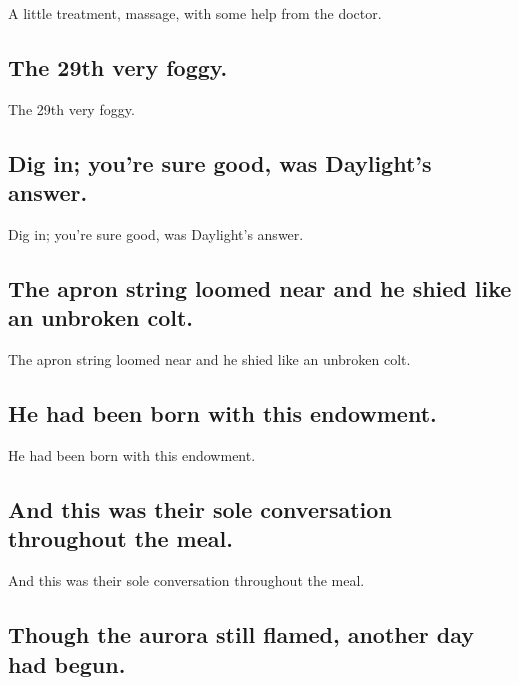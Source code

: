 \documentclass[]{article}
\begin{document}
A little treatment, massage, with some help from the doctor.

\hypertarget{the-29th-very-foggy.}{%
\subsection{The 29th very foggy.}\label{the-29th-very-foggy.}}

The 29th very foggy.

\hypertarget{dig-in-youre-sure-good-was-daylights-answer.}{%
\subsection{Dig in; you're sure good, was Daylight's
answer.}\label{dig-in-youre-sure-good-was-daylights-answer.}}

Dig in; you're sure good, was Daylight's answer.

\hypertarget{the-apron-string-loomed-near-and-he-shied-like-an-unbroken-colt.}{%
\subsection{The apron string loomed near and he shied like an unbroken
colt.}\label{the-apron-string-loomed-near-and-he-shied-like-an-unbroken-colt.}}

The apron string loomed near and he shied like an unbroken colt.

\hypertarget{he-had-been-born-with-this-endowment.}{%
\subsection{He had been born with this
endowment.}\label{he-had-been-born-with-this-endowment.}}

He had been born with this endowment.

\hypertarget{and-this-was-their-sole-conversation-throughout-the-meal.}{%
\subsection{And this was their sole conversation throughout the
meal.}\label{and-this-was-their-sole-conversation-throughout-the-meal.}}

And this was their sole conversation throughout the meal.

\hypertarget{though-the-aurora-still-flamed-another-day-had-begun.}{%
\subsection{Though the aurora still flamed, another day had
begun.}\label{though-the-aurora-still-flamed-another-day-had-begun.}}
\end{document}
